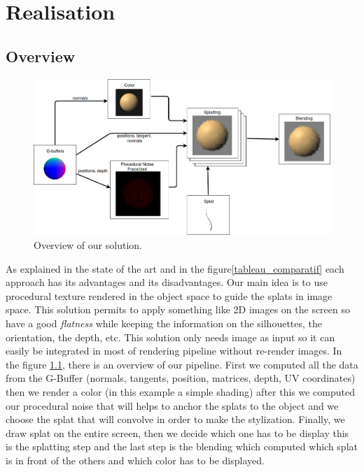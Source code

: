 \chapter{Realisation}


\section{Overview}

\begin{figure}[H]
    \begin{center}
    \includegraphics[scale=0.4]{images/Overview2.png}
    \end{center}
    \caption{Overview of our solution.}
    \label{overview}
\end{figure}

As explained in the state of the art and in the figure\ref{tableau_comparatif} each approach has its advantages and its disadvantages. Our main idea is to use procedural texture rendered in the object space to guide the splats in image space.  This solution permits to apply something like 2D images on the screen so have a good \textit{flatness} while keeping the information on the silhouettes, the orientation, the depth, etc. This solution only needs image as input so it can easily be integrated in most of rendering pipeline without re-render images. In the figure \ref{overview}, there is an overview of our pipeline. First we computed all the data from the G-Buffer (normals, tangents, position, matrices, depth, UV coordinates) then we render a color (in this example a simple shading) after this we computed our procedural noise that will helps to anchor the splats to the object and we choose the splat that will convolve in order to make the stylization. Finally, we draw splat on the entire screen, then we decide which one has to be display this is the splatting step and the last step is the blending which computed which splat is in front of the others and which color has to be displayed. \newline

